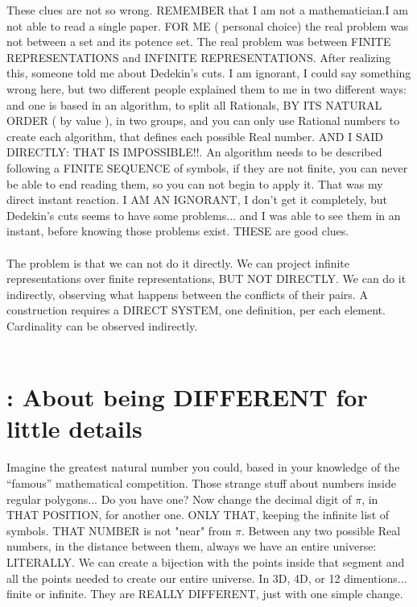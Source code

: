 		\noindent
		These clues are not so wrong. REMEMBER that I am not a mathematician.I am not able to read a single paper. FOR ME ( personal choice) the real problem was not between a set and its potence set. The real problem was between FINITE REPRESENTATIONS and INFINITE REPRESENTATIONS. After realizing this, someone told me about Dedekin's cuts. I am ignorant, I could say something wrong here, but two different people explained them to me in two different ways: and one is based in an algorithm, to split all Rationals, BY ITS NATURAL ORDER ( by value ), in two groups, and you can only use Rational numbers to create each algorithm, that defines each possible Real number. AND I SAID DIRECTLY: THAT IS IMPOSSIBLE!!. An algorithm needs to be described following a FINITE SEQUENCE of symbols, if they are not finite, you can never be able to end reading them, so you can not begin to apply it. That was my direct instant reaction. I AM AN IGNORANT, I don't get it completely, but Dedekin's cuts seems to have some problems... and I was able to see them in an instant, before knowing those problems exist. THESE are good clues.
		\\\\
		
		\noindent
		The problem is that we can not do it directly. We can project infinite representations over finite representations, BUT NOT DIRECTLY. We can do it indirectly, observing what happens between the conflicts of their pairs. A construction requires a DIRECT SYSTEM, one definition, per each element. Cardinality can be observed indirectly.
		\\\\ 

	\section{\:: About being DIFFERENT for little details}
	
		\noindent
		Imagine the greatest natural number you could, based in your knowledge of the ``famous'' mathematical competition. Those strange stuff about numbers inside regular polygons... Do you have one? Now change the decimal digit of $\pi$, in THAT POSITION, for another one. ONLY THAT, keeping the infinite list of symbols. THAT NUMBER is not "near" from $\pi$. Between any two possible Real numbers, in the distance between them, always we have an entire universe: LITERALLY. We can create a bijection with the points inside that segment and all the points needed to create our entire universe. In 3D, 4D, or 12 dimentions... finite or infinite. They are REALLY DIFFERENT, just with one simple change.
		\\\\
		

